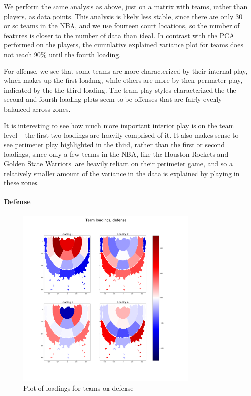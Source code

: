 \documentclass[]{article}
\let\oldparagraph\paragraph
\renewcommand{\paragraph}[1]{\oldparagraph{#1}\mbox{}}
\begin{document}
We perform the same analysis as above, just on a matrix with teams,
rather than players, as data points. This analysis is likely less
stable, since there are only 30 or so teams in the NBA, and we use
fourteen court locations, so the number of features is closer to the
number of data than ideal. In contrast with the PCA performed on the
players, the cumulative explained variance plot for teams does not reach
90\% until the fourth loading.

For offense, we see that some teams are more characterized by their
internal play, which makes up the first loading, while others are more
by their perimeter play, indicated by the the third loading. The team
play styles characterized the the second and fourth loading plots seem
to be offenses that are fairly evenly balanced across zones.

It is interesting to see how much more important interior play is on the
team level -- the first two loadings are heavily comprised of it. It
also makes sense to see perimeter play highlighted in the third, rather
than the first or second loadings, since only a few teams in the NBA,
like the Houston Rockets and Golden State Warriors, are heavily reliant
on their perimeter game, and so a relatively smaller amount of the
variance in the data is explained by playing in these zones.

\paragraph{Defense}\label{defense-1}

\begin{figure}
\centering
\includegraphics[width=0.80000\textwidth]{first_4_loadings_teams_def.png}
\caption{Plot of loadings for teams on defense}
\end{figure}
\end{document}
